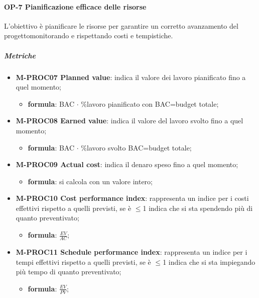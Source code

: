 			\paragraph{OP-7 Pianificazione efficace delle risorse}
			L'obiettivo è pianificare le risorse per garantire un corretto avanzamento del progetto\glosp monitorando e rispettando costi e tempistiche.
			\subparagraph{Metriche}
			\begin{itemize}		
				\item \textbf{M-PROC07 Planned value}: indica il valore dei lavoro pianificato fino a quel momento;
				\begin{itemize}
					\item[] \textbf{formula}: BAC $\cdot$ \%lavoro pianificato con BAC=budget totale;
				\end{itemize}
				
				\item \textbf{M-PROC08 Earned value}: indica il valore del lavoro svolto fino a quel momento;
				\begin{itemize}
					\item[] \textbf{formula}: BAC $\cdot$ \%lavoro svolto BAC=budget totale;
				\end{itemize} 
				
				\item \textbf{M-PROC09 Actual cost}: indica il denaro speso fino a quel momento; 
				\begin{itemize}
					\item[] \textbf{formula}: si calcola con un valore intero;
				\end{itemize}
				
				\item \textbf{M-PROC10 Cost performance index}: rappresenta un indice per i costi effettivi rispetto a quelli previsti, se è $\le$1 indica che si sta spendendo più di quanto preventivato;
				\begin{itemize}
					\item[] \textbf{formula}: $\frac{EV}{AC}$; 
				\end{itemize}
				
				\item \textbf{M-PROC11 Schedule performance index}: rappresenta un indice per i tempi effettivi rispetto a quelli previsti, se è $\le$1 indica che si sta impiegando più tempo di quanto preventivato;
				\begin{itemize}
					\item[] \textbf{formula}: $\frac{EV}{PV}$; 
				\end{itemize}
				

\end{itemize}
